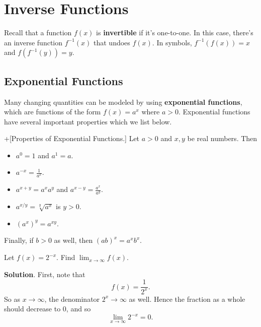 \documentclass[10pt,]{book}
\newcommand{\terminology}[1]{\textbf{#1}}
\theoremstyle{ptxplainnotitle}
\theoremstyle{ptxplaintitle}
\theoremstyle{ptxplainnotitle}
\theoremstyle{ptxplaintitle}
\theoremstyle{ptxplainnotitle}
\theoremstyle{ptxplaintitle}
\theoremstyle{ptxdefinitionnotitle}
\theoremstyle{ptxdefinitiontitle}
\theoremstyle{ptxdefinitionnotitle}
\theoremstyle{ptxdefinitiontitle}
\theoremstyle{ptxdefinitionnotitle}
\theoremstyle{ptxdefinitiontitle}
\theoremstyle{ptxdefinitionnotitle}
\theoremstyle{ptxdefinitiontitle}
\theoremstyle{ptxdefinitionnotitle}
\theoremstyle{ptxdefinitiontitle}
\numberwithin{equation}{section}
\begin{document}
\chapter[{Inverse Functions}]{Inverse Functions}\label{inverse-functions}
\hypertarget{p-185}{}%
Recall that a function \(f(x)\) is \terminology{invertible} if it's one-to-one. In this case, there's an inverse function \(f^{-1}(x)\) that undoes \(f(x)\). In symbols, \(f^{-1}(f(x)) = x\) and \(f(f^{-1}(y)) = y\).%
\typeout{************************************************}
\typeout{************************************************}
\section[{Exponential Functions}]{Exponential Functions}\label{section-exponential-functions}
\hypertarget{p-186}{}%
Many changing quantities can be modeled by using \terminology{exponential functions}, which are functions of the form \(f(x) = a^{x}\) where \(a > 0\). Exponential functions have several important properties which we list below.%
\begin{theorem}+[{Properties of Exponential Functions.}]\label{theorem-properties-of-exponential-functions}
\hypertarget{p-187}{}%
Let \(a > 0\) and \(x,y\) be real numbers. Then \leavevmode%
\begin{itemize}[label=\textbullet]
\item{}\(a^{0} = 1\) and \(a^{1} = a\).%
\item{}\(a^{-x} = \frac{1}{a^{x}}\).%
\item{}\(a^{x+y} = a^{x}a^{y}\) and \(a^{x-y} = \frac{a^{x}}{a^{y}}\).%
\item{}\(a^{x/y} = \sqrt[y]{a^{x}}\) is \(y > 0\).%
\item{}\((a^{x})^{y} = a^{xy}\).%
\end{itemize}
 Finally, if \(b > 0\) as well, then \((ab)^{x} = a^{x}b^{x}\).%
\end{theorem}
\begin{example}\label{example-limit-of-an-exponential-function}
\hypertarget{p-188}{}%
Let \(f(x) = 2^{-x}\). Find \(\lim_{x\to\infty}f(x)\).%
\par\smallskip%
\noindent\textbf{Solution}.\hypertarget{solution-42}{}\quad%
\hypertarget{p-189}{}%
First, note that%
\begin{equation*}
f(x) = \frac{1}{2^{x}}.
\end{equation*}
So as \(x\to\infty\), the denominator \(2^{x}\to\infty\) as well. Hence the fraction as a whole should decrease to \(0\), and so%
\begin{equation*}
\lim_{x\to\infty}2^{-x} = 0.
\end{equation*}
%
\end{example}
\end{document}
